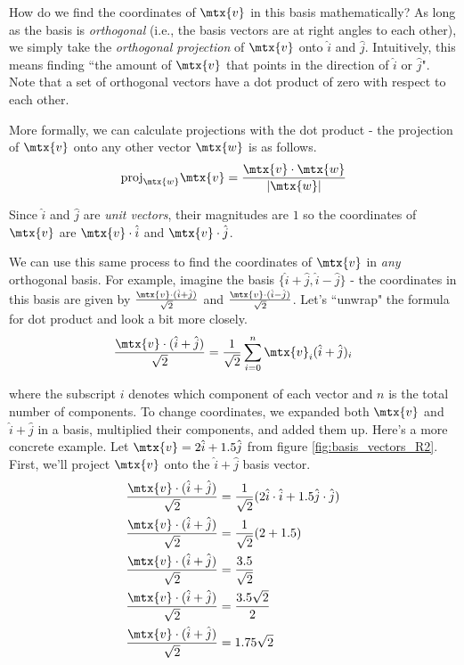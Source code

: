 How do we find the coordinates of $\mtx{v}$ in this basis mathematically? As
long as the basis is \textit{orthogonal} (i.e., the basis vectors are at right
angles to each other), we simply take the \textit{orthogonal projection} of
$\mtx{v}$ onto $\hat{i}$ and $\hat{j}$. Intuitively, this means finding ``the
amount of $\mtx{v}$ that points in the direction of $\hat{i}$ or $\hat{j}$".
Note that a set of orthogonal vectors have a dot product of zero with respect to
each other.

More formally, we can calculate projections with the dot product - the
projection of $\mtx{v}$ onto any other vector $\mtx{w}$ is as follows.
\begin{equation*}
  \text{proj}_\mtx{w} \mtx{v} = \frac{\mtx{v} \cdot \mtx{w}}{|\mtx{w}|}
\end{equation*}

Since $\hat{i}$ and $\hat{j}$ are \textit{unit vectors}, their magnitudes are
$1$ so the coordinates of $\mtx{v}$ are $\mtx{v} \cdot \hat{i}$ and
$\mtx{v} \cdot \hat{j}$.

We can use this same process to find the coordinates of $\mtx{v}$ in
\textit{any} orthogonal basis. For example, imagine the basis
$\{\hat{i} + \hat{j}, \hat{i} - \hat{j}\}$ - the coordinates in this basis are
given by $\frac{\mtx{v} \cdot (\hat{i} + \hat{j})}{\sqrt{2}}$ and
$\frac{\mtx{v} \cdot (\hat{i} - \hat{j})}{\sqrt{2}}$. Let's ``unwrap" the
formula for dot product and look a bit more closely.
\begin{equation*}
  \frac{\mtx{v} \cdot (\hat{i} + \hat{j})}{\sqrt{2}} =
    \frac{1}{\sqrt{2}} \sum_{i=0}^n \mtx{v}_i (\hat{i} + \hat{j})_i
\end{equation*}

where the subscript $i$ denotes which component of each vector and $n$ is the
total number of components. To change coordinates, we expanded both $\mtx{v}$
and $\hat{i} + \hat{j}$ in a basis, multiplied their components, and added them
up. Here's a more concrete example. Let $\mtx{v} = 2\hat{i} + 1.5\hat{j}$ from
figure \ref{fig:basis_vectors_R2}. First, we'll project $\mtx{v}$ onto the
$\hat{i} + \hat{j}$ basis vector.
\begin{align*}
  \frac{\mtx{v} \cdot (\hat{i} + \hat{j})}{\sqrt{2}} &=
    \frac{1}{\sqrt{2}} (2\hat{i} \cdot \hat{i} + 1.5\hat{j} \cdot \hat{j}) \\
  \frac{\mtx{v} \cdot (\hat{i} + \hat{j})}{\sqrt{2}} &=
    \frac{1}{\sqrt{2}} (2 + 1.5) \\
  \frac{\mtx{v} \cdot (\hat{i} + \hat{j})}{\sqrt{2}} &= \frac{3.5}{\sqrt{2}} \\
  \frac{\mtx{v} \cdot (\hat{i} + \hat{j})}{\sqrt{2}} &= \frac{3.5\sqrt{2}}{2} \\
  \frac{\mtx{v} \cdot (\hat{i} + \hat{j})}{\sqrt{2}} &= 1.75\sqrt{2}
\end{align*}

